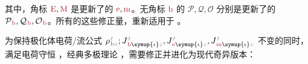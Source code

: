 其中，角标 $\textcolor{Maroon}{\text{E}},\textcolor{Maroon}{\text{M}}$ 是更新了的 $\textcolor{Maroon}{\text{e}},\textcolor{Maroon}{\text{m}}$。无角标 $\textcolor{Maroon}{\text{b}}$ 的 $\mathcal{P},\mathcal{Q},\mathcal{O}$ 分别是更新了的 $\mathcal{P}_{\;\!\textcolor{Maroon}{\text{b}}},\mathcal{Q}_{\;\!\textcolor{Maroon}{\text{b}}},\mathcal{O}_{\;\!\textcolor{Maroon}{\text{b}}}$。所有的这些修正量，重新适用于 。

为保持极化体电荷/流公式 ${\rho}^{\;\!\mathcolor{gray}{t}}_{\;\!\textcolor{Maroon}{\text{b}} \mathcolor{gray}{z}};{J}^{\;\!\mathcolor{gray}{t}}_{\;\!\textcolor{Maroon}{\text{b}} \symup{\iota} \mathcolor{gray}{z}},{J}^{\;\!\mathcolor{gray}{t}}_{\;\!\textcolor{Maroon}{\text{e}} \symup{\iota} \mathcolor{gray}{z}},{J}^{\;\!\mathcolor{gray}{t}}_{\;\!\textcolor{Maroon}{\text{m}} \symup{\iota} \mathcolor{gray}{z}}$ 不变的同时，满足电荷守恒 ，经典多极理论 ，需要修正并进化为现代奇异版本：
